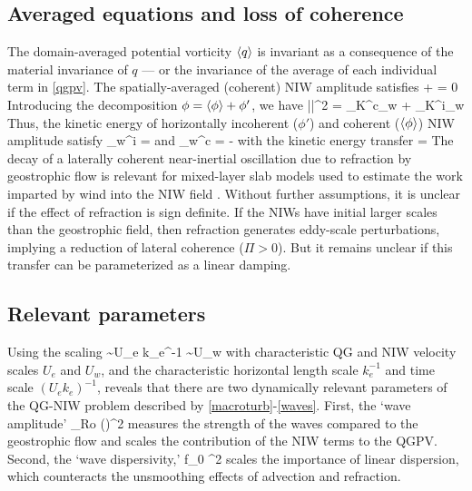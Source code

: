 \documentclass{jfm}
\begin{document}
\subsection{Averaged equations and loss of coherence}
The domain-averaged potential vorticity $\langle q \rangle$ is invariant as a consequence of
the material invariance of $q$ --- or the invariance of the average of each
individual term in \eqref{qgpv}. The spatially-averaged (coherent) NIW amplitude
satisfies
\beq
\label{phi_ave}
\la \phi \ra + \ii \left\la\half\phi\lap\psi \right\ra = 0\per
\eeq
Introducing the decomposition $\phi = \langle\phi\rangle+\phi'$, we have
\beq
\half\la|\phi|^2\ra
= _{ K^c_w} +
_{ K^i_w}\com
\eeq
Thus, the kinetic energy of horizontally incoherent ($\phi'$) and coherent
($\langle\phi\rangle$) NIW amplitude satisfy
\beq
\label{Kiw}
_w^i = \Pi\com
\eeq
and
\beq
\label{Kcw}
_w^c = -\Pi\com
\eeq
with the kinetic energy transfer
\beq
\label{Pi}
\Pi = \left[\la\half\phi\lap\psi\ra\la\phis\ra -
\la\half\phis\lap\psi\ra\la\phi\ra\right]\per
\eeq
The decay of a laterally coherent near-inertial oscillation due to refraction by
geostrophic flow is relevant for mixed-layer slab models used to estimate the work
imparted by wind into the NIW field \citep[e.g., ][]{alford2001}. Without further
assumptions, it is unclear if the effect of refraction is sign definite. If the
NIWs have initial larger scales than the geostrophic field, then refraction
generates eddy-scale perturbations, implying a reduction of lateral coherence
($\Pi > 0$). But it remains unclear if this transfer can be parameterized as a linear
damping.

\subsection{Relevant parameters}
Using the scaling
\beq
\psi \sim U_e k_e^{-1} \com\qquad {} \qquad \phi \sim U_w\com
\eeq
with characteristic QG and NIW velocity scales $U_e$ and $U_w$, and the
characteristic horizontal length scale $k_e^{-1}$ and time scale $(U_e k_e)^{-1}$,
reveals that there are two dynamically relevant parameters of the QG-NIW problem
described by \eqref{macroturb}-\eqref{waves}. First, the `wave amplitude'
\beq
\label{alpha}
\alpha {} {}_{ Ro} \times
{\left(\right)^2}\com
\eeq
measures the strength of the waves compared to the geostrophic flow and scales
the contribution of the NIW terms to the QGPV.
Second, the `wave dispersivity,'
\beq
\label{hslash}
\hslash {} f_0 \lambda^2 \times {}\com
\eeq
scales the importance of linear dispersion, which counteracts the unsmoothing
effects of advection and refraction.
\end{document}
